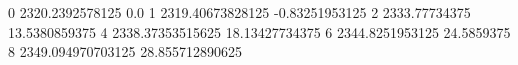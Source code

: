 0 2320.2392578125 0.0
1 2319.40673828125 -0.83251953125
2 2333.77734375 13.5380859375
4 2338.37353515625 18.13427734375
6 2344.8251953125 24.5859375
8 2349.094970703125 28.855712890625
